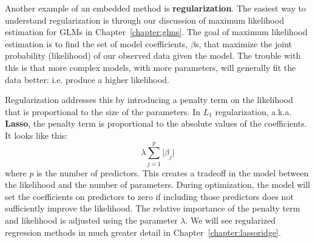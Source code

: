 Another example of an embedded method is \textbf{regularization}. The easiest way to understand regularization is through our discussion of maximum likelihood estimation for GLMs in Chapter~\ref{chapter:glms}. The goal of maximum likelihood estimation is to find the set of model coefficients, $\beta$s, that maximize the joint probability (likelihood) of our observed data given the model. The trouble with this is that more complex models, with more parameters, will generally fit the data better: i.e. produce a higher likelihood.

Regularization addresses this by introducing a penalty term on the likelihood that is proportional to the size of the parameters. In $L_1$ regularization, a.k.a. \textbf{Lasso}, the penalty term is proportional to the absolute values of the coefficients. It looks like this:
$$ \lambda \sum_{j=1}^p \vert \beta_j \vert $$
where $p$ is the number of predictors. This creates a tradeoff in the model between the likelihood and the number of parameters. During optimization, the model will set the coefficients on predictors to zero if including those predictors does not sufficiently improve the likelihood. The relative importance of the penalty term and likelihood is adjusted using the parameter $\lambda$. We will see regularized regression methods in much greater detail in Chapter~\ref{chapter:lassoridge}. 

\vspace{2mm} 

